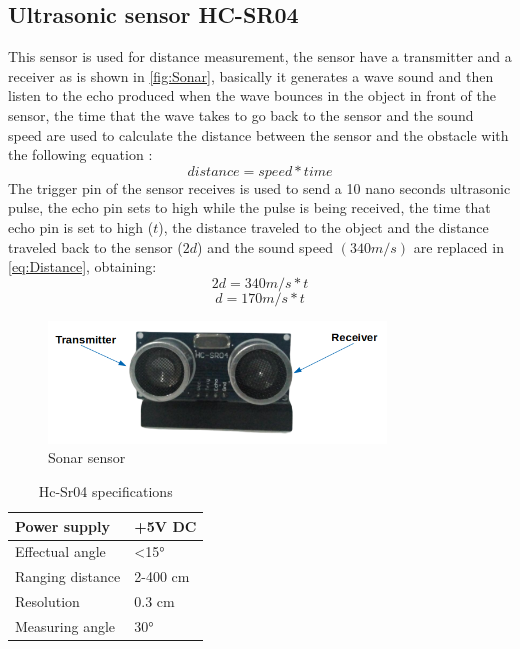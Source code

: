 \subsection{Ultrasonic sensor HC-SR04}
This sensor is used for distance measurement, the sensor have a transmitter and a receiver as is shown in  \autoref{fig:Sonar}, basically it generates a wave sound and then listen to the echo produced when the wave bounces in the object in front of the sensor, the time that the wave takes to go back to the sensor and the sound speed are used to calculate the distance between the sensor and the obstacle with the following equation \citep{morgan2014hcsr04}: 
\begin{equation}
    distance=speed*time
\label{eq:Distance}
\end{equation}
The trigger pin of the sensor receives is used to send a 10 nano seconds ultrasonic pulse, the echo pin sets to high while the pulse is being received, the time that echo pin is set to high ($t$), the distance traveled to the object and the distance traveled back to the sensor ($2d$) and the sound speed $(340 m/s)$ are replaced in \autoref{eq:Distance}, obtaining:
\[2d=340m/s*t\]
\[d=170m/s*t\]
\begin{figure}[h!]
    \centering
 	\includegraphics[trim=0 0 0 0,clip,width=0.8\textwidth]{Figs/Sonar1.png}
    \caption{Sonar sensor}
    \label{fig:Sonar}
\end{figure}

\begin{table}[h!]
\caption{Hc-Sr04 specifications}
\begin{centering}
\begin{tabular}{>{\centering}p{7cm}>{\centering}p{4cm}}
\hline 
\raggedright{}Power supply & \raggedright{}+5V DC\tabularnewline
\hline 
\raggedright{}Effectual angle & \raggedright{}<15°\tabularnewline
\hline 
\raggedright{}Ranging distance & \raggedright{}2-400 cm\tabularnewline
\hline 
\raggedright{}Resolution & \raggedright{}0.3 cm\tabularnewline
\hline 
\raggedright{}Measuring angle & \raggedright{}30°\tabularnewline
\hline 
\end{tabular}
\par\end{centering}
\end{table}



